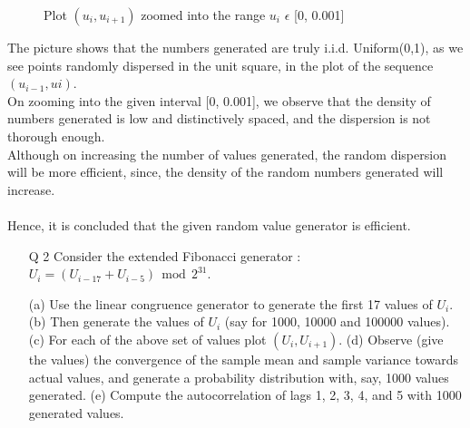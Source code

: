 \documentclass[11pt]{article}
\begin{document}
\begin{figure}[H]
  \centering
      \caption{Plot $(u_i, u_{i+1})$ zoomed into the range $u_i$ $\epsilon$ [0, 0.001]}
\end{figure}

The picture shows that the numbers generated are truly i.i.d. Uniform(0,1), as we see points randomly dispersed in the unit square, in the plot of the sequence $(u_{i-1}, u{i})$.\\
On zooming into the given interval [0, 0.001], we observe that the density of numbers generated is low and distinctively spaced, and the dispersion is not thorough enough.\\
Although on increasing the number of values generated, the random dispersion will be more efficient, since, the density of the random numbers generated will increase.\\\\
Hence, it is concluded that the given random value generator is efficient.

\newpage

\begin{enumerate}
\item[Q 2] Consider the extended Fibonacci generator :
$U_i = (U_{i-17} + U_{i-5}) ~~ \mbox{mod} ~~ 2^{31}$.

(a) Use the linear congruence generator to generate the first 17 values of $U_i$.
(b) Then generate the values of $U_i$ (say for 1000, 10000 and 100000 values).
(c) For each of the above set of values plot $(U_{i}, U_{i+1})$.
(d) Observe (give the values) the convergence of the sample mean and sample variance towards actual values, and generate a probability distribution with, say, 1000 values generated.
(e) Compute the autocorrelation of lags 1, 2, 3, 4, and 5 with 1000 generated values.
\end{enumerate}
\end{document}
